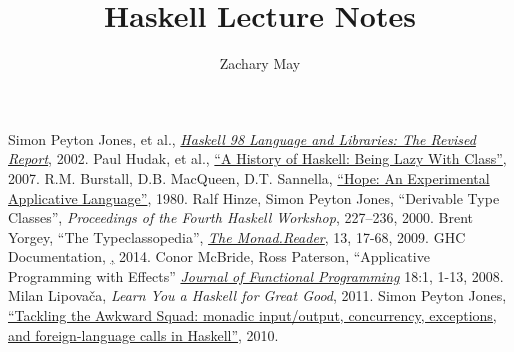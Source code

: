 \documentclass[12pt]{article}
\author{Zachary May}
\title{Haskell Lecture Notes}
\begin{document}
\maketitle










\begin{thebibliography}{99}
  Simon Peyton Jones, et al.,
  \href{http://www.haskell.org/onlinereport/index.html}{\emph{Haskell 98 Language and Libraries: The Revised Report}},
  2002.
  Paul Hudak, et al.,
  \href{http://www.scs.stanford.edu/\~dbg/readings/haskell-history.pdf}{``A History of Haskell: Being Lazy With Class''},
  2007.
  R.M. Burstall, D.B. MacQueen, D.T. Sannella,
  \href{http://homepages.inf.ed.ac.uk/dts/pub/hope.pdf}{``Hope: An Experimental Applicative Language''},
  1980.
  Ralf Hinze, Simon Peyton Jones,
  ``Derivable Type Classes'',
  \emph{Proceedings of the Fourth Haskell Workshop}, 227--236,
  2000.
  Brent Yorgey,
  ``The Typeclassopedia'',
  \href{http://www.haskell.org/wikiupload/8/85/TMR-Issue13.pdf}{\emph{The Monad.Reader}}, 13, 17-68,
  2009.
  GHC Documentation,
  \href{http://www.haskell.org/ghc/docs/7.8.3/html/},
  2014.
  Conor McBride, Ross Paterson,
  ``Applicative Programming with Effects''
  \href{}{\emph{Journal of Functional Programming}} 18:1, 1-13,
  2008.
  Milan Lipova\v{c}a,
  \emph{Learn You a Haskell for Great Good},
  2011.
  Simon Peyton Jones,
  \href{http://research.microsoft.com/en-us/um/people/simonpj/papers/marktoberdorf/mark.pdf}
       {``Tackling the Awkward Squad: monadic input/output, concurrency, exceptions, and foreign-language calls in Haskell''},
  2010.
\end{thebibliography}
\end{document}
